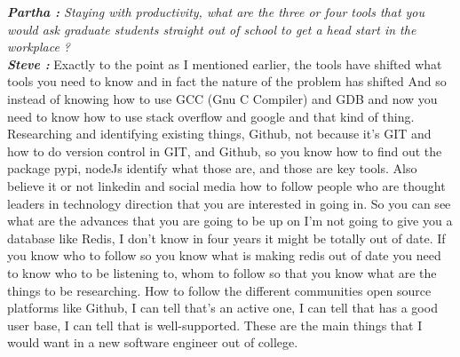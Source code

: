 \documentclass[a4paper, 12pt]{article}
\begin{document}
\begin{flushleft}
        \textit {\textbf {Partha :} Staying with productivity, what are the three or four  tools that you would ask graduate students straight out of school to get a head start in the workplace ?} \\
        \textit {\textbf {Steve :}} Exactly to the point as I mentioned earlier, the tools have shifted what tools you need to know and in fact the nature of the problem has shifted  And so instead of knowing how to use GCC (Gnu C Compiler) and GDB and now you need to know how to use stack overflow and google and that kind of thing. Researching and identifying existing things, Github, not because it’s GIT and how to do version control in GIT, and Github, so you know how to find out the package pypi, nodeJs identify what those are, and those are key tools. Also believe it or not linkedin and social media how to follow people who are thought leaders in technology direction that you are interested in going in. So you can see what are the advances that you are going to be up on I'm not going to give you a database like Redis, I don’t know in four years it might be totally out of date. If you know who to follow so you know what is making redis out of date you need to know who to be listening to, whom to follow so that you know what are the things to be researching. How to follow the different communities open source platforms like Github, I can tell that’s an active one, I can tell that has a good user base, I can tell that is well-supported. These are the main things that I would want in a new software engineer  out of college. \\~\\


\end{flushleft}
\end{document}
